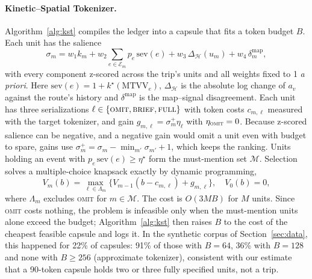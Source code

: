 \paragraph{Kinetic--Spatial Tokenizer.}
Algorithm~\ref{alg:kst} compiles the ledger into a capsule that fits a token budget $B$.
Each unit has the salience
\begin{equation}
\sigma_m=w_1k_m+w_2\!\!\sum_{e\in\mathcal E_m}\!\!p_e\,\mathrm{sev}(e)+w_3\,\Delta_{\mathcal H}(u_m)+w_4\,\delta^{\mathrm{map}}_m ,
\end{equation}
with every component z-scored across the trip's units and all weights fixed to 1 \emph{a priori}.
Here $\mathrm{sev}(e)=1+k^\star(\mathrm{MTVV}_e)$, $\Delta_{\mathcal H}$ is the absolute log change of $a_v$ against the route's history and $\delta^{\mathrm{map}}$ is the map--signal disagreement.
Each unit has three serializations $\ell\in\{\textsc{omit},\textsc{brief},\textsc{full}\}$ with token costs $c_{m,\ell}$ measured with the target tokenizer, and gain $g_{m,\ell}=\sigma^+_m\eta_\ell$ with $\eta_{\textsc{omit}}=0$.
Because z-scored salience can be negative, and a negative gain would omit a unit even with budget to spare, gains use $\sigma^+_m=\sigma_m-\min_{m'}\sigma_{m'}+1$, which keeps the ranking.
Units holding an event with $p_e\,\mathrm{sev}(e)\ge\eta^\star$ form the must-mention set $\mathcal M$.
Selection solves a multiple-choice knapsack exactly by dynamic programming,
\begin{equation}
V_m(b)=\max_{\ell\in\Lambda_m}\bigl\{V_{m-1}(b-c_{m,\ell})+g_{m,\ell}\bigr\},\quad V_0(b)=0,
\label{eq:knap}
\end{equation}
where $\Lambda_m$ excludes \textsc{omit} for $m\in\mathcal M$.
The cost is $O(3MB)$ for $M$ units.
Since \textsc{omit} costs nothing, the problem is infeasible only when the must-mention units alone exceed the budget; Algorithm~\ref{alg:kst} then raises $B$ to the cost of the cheapest feasible capsule and logs it.
In the synthetic corpus of Section~\ref{sec:data}, this happened for 22\% of capsules: 91\% of those with $B=64$, 36\% with $B=128$ and none with $B\ge256$ (approximate tokenizer), consistent with our estimate that a 90-token capsule holds two or three fully specified units, not a trip.

